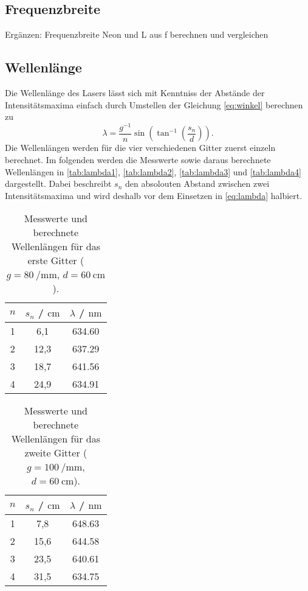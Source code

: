 \subsection{Frequenzbreite}
Ergänzen: Frequenzbreite Neon und L aus f berechnen und vergleichen

\subsection{Wellenlänge}
Die Wellenlänge des Lasers lässt sich mit Kenntniss der Abstände der Intensitätsmaxima einfach durch
Umstellen der Gleichung \eqref{eq:winkel} berechnen zu
\begin{equation}
  \label{eq:lambda}
  \lambda = \frac{g^{-1}}{n} \sin\left(\tan^{-1}\left(\frac{s_n}{d}\right)\right).
\end{equation}
Die Wellenlängen werden für die vier verschiedenen Gitter zuerst einzeln berechnet.
Im folgenden werden die Messwerte sowie daraus berechnete Wellenlängen in \autoref{tab:lambda1}, \autoref{tab:lambda2},
\autoref{tab:lambda3} und \autoref{tab:lambda4} dargestellt.
Dabei beschreibt $s_n$ den absolouten Abstand zwischen zwei Intensitätsmaxima und wird deshalb vor dem Einsetzen in
\eqref{eq:lambda} halbiert.
\begin{table}[H]
  \centering
  \begin{tabular}{c|c|c}
    $n$ & $s_n$ / $\unit{\centi\metre}$& $\lambda$ / $\unit{\nano\metre}$ \\
    \hline
    1 & 6,1 & 634.60 \\
    2 & 12,3 & 637.29 \\
    3 & 18,7 & 641.56 \\
    4 & 24,9 & 634.91
  \end{tabular}
  \caption{Messwerte und berechnete Wellenlängen für das erste Gitter ($g=\qty{80}{\per\milli\metre}$, $d=\qty{60}{\centi\metre}$).}
\label{tab:lambda1}
\end{table}
\begin{table}[H]
  \centering
  \begin{tabular}{c|c|c}
    $n$ & $s_n$ / $\unit{\centi\metre}$& $\lambda$ / $\unit{\nano\metre}$ \\
    \hline
    1 & 7,8 & 648.63 \\
    2 & 15,6 & 644.58 \\
    3 & 23,5 & 640.61 \\
    4 & 31,5 & 634.75
  \end{tabular}
  \caption{Messwerte und berechnete Wellenlängen für das zweite Gitter ($g=\qty{100}{\per\milli\metre}$, $d=\qty{60}{\centi\metre}$).}
\label{tab:lambda2}
\end{table}
